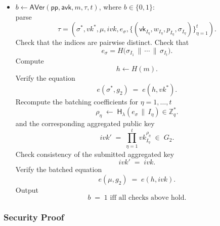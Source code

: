 \documentclass{article}
\newcommand{\vk}[0]{\mathsf{vk}}
\begin{document}
\begin{itemize}
        Set
        \[
          \sigma^\ast \;=\; \prod_{\eta=1}^{t} \sigma_{I_\eta} \;\in\; G_1,
        \]
        \[
          vk^\ast \;=\; \prod_{\eta=1}^{t} \vk_{I_\eta} \;\in\; G_2.
        \]
        Compute a seed
        \[
          e_\sigma \;\leftarrow\; H\!\bigl(\sigma_1 \,\|\, \cdots \,\|\, \sigma_t \,\bigr),
        \]
        and coefficients for $\eta=1,\dots,t$
        \[
          \rho_\eta \;\leftarrow\; \mathsf{H_\lambda}(e_\sigma \,\|\, I_\eta) \in \mathbb{Z}_q^\ast.
        \]
        Compute the aggregates with seed
        \[
          \mu \;=\; \prod_{\eta=1}^{t} \sigma_{I_\eta}^{\rho_\eta} \;\in\; G_1,
        \]
        \[
          ivk \;=\; \prod_{\eta=1}^{t} vk_{I_\eta}^{\rho_\eta} \;\in\; G_2.
        \]
        Output
        \[
          \tau \;=\; (\,\sigma^\ast,\, vk^\ast,\, \mu,\, ivk,\, e_\sigma,\{(\vk_{I_\eta},w_{I_\eta},p_{I_\eta},\sigma_{I_\eta})\}_{\eta=1}^{t}).
        \]

  \item $b \leftarrow \mathsf{AVer}(\mathsf{pp}, \mathsf{avk}, m, \tau, t)$, where $b\in\{0,1\}$:\\
        parse
        \[
          \tau=(\sigma^\ast, vk^\ast, \mu, ivk, e_\sigma,\{(\vk_{I_\eta},w_{I_\eta},p_{I_\eta},\sigma_{I_\eta})\}_{\eta=1}^{t}).
        \]
        Check that the indices are pairwise distinct.
        Check that
        \[
          e_\sigma = H\!\bigl(\sigma_{I_1}\,\|\,\cdots\,\|\,\sigma_{I_t}\bigr).
        \]
        Compute
        \[
          h \leftarrow H(m).
        \]
        Verify the equation
        \[
          e(\sigma^\ast, g_2) \;=\; e(h, vk^\ast).
        \]
        Recompute the batching coefficients for $\eta=1,\dots,t$
        \[
          \rho_\eta \;\leftarrow\; \mathsf{H_\lambda}(e_\sigma \,\|\, I_\eta) \in \mathbb{Z}_q^\ast.
        \]
        and the corresponding aggregated public key
        \[
          ivk' \;=\; \prod_{\eta=1}^{t} vk_{I_\eta}^{\rho_\eta} \;\in\; G_2.
        \]
        Check consistency of the submitted aggregated key
        \[
          ivk' \;=\; ivk.
        \]
        Verify the batched equation
        \[
          e(\mu, g_2) \;=\; e(h, ivk).
        \]
        Output
        \[
          b \;=\; 1 \text{ iff all checks above hold.}
        \]
\end{itemize}


\subsubsection{Security Proof}
\end{document}
